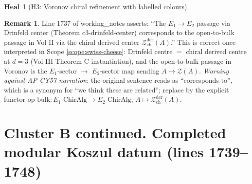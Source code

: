 \documentclass[11pt]{amsart}
\theoremstyle{definition}
\newtheorem{heal}[attack]{Heal}
\newtheorem{remark}{Remark}
\providecommand{\Eone}{E_1}
\providecommand{\Etwo}{E_2}
\providecommand{\cZ}{\mathcal{Z}}
\begin{document}
\begin{heal}[H3: Voronov chiral refinement with labelled colours]
\begin{remark}
Line 1737 of working\_notes asserts: ``The $\Eone \to \Etwo$ passage
via Drinfeld center (Theorem c3-drinfeld-center) corresponds to the
open-to-bulk passage in Vol II via the chiral derived center
$\cZ^{\mathrm{der}}_{\mathrm{ch}}(A)$.'' This is correct once
interpreted in Scope \ref{scope:swiss-cheese}: Drinfeld centre $=$
chiral derived centre at $d=3$ (Vol III Theorem C instantiation), and
the open-to-bulk passage in Voronov is the $\Eone$-sector $\to$
$\Etwo$-sector map sending $A \mapsto \cZ(A)$.  {\em Warning
against AP-CY57 narration}: the original sentence reads as
``corresponds to'', which is a synonym for ``we think these are
related''; replace by the explicit functor
$\mathrm{op\text{-}bulk}\colon \Eone\text{-ChirAlg} \to \Etwo\text{-ChirAlg}$,
$A \mapsto \cZ^{\mathrm{der}}_{\mathrm{ch}}(A)$.
\end{remark}
\end{heal}

\section{Cluster B continued. Completed modular Koszul datum (lines 1739--1748)}
\end{document}
